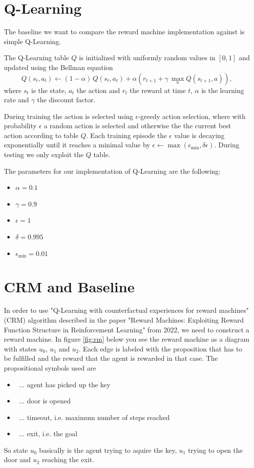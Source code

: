 \documentclass[12pt, a4paper]{article}
\begin{document}
\section*{Q-Learning}

The baseline we want to compare the reward machine implementation against is simple Q-Learning.

The Q-Learning table $Q$ is initialized with uniformly random values in $[0, 1]$ and updated using the Bellman equation
$$ Q(s_t, a_t) \leftarrow (1 - \alpha) \, Q(s_t, a_t) + \alpha \left( r_{t+1} + \gamma \, \max_a Q(s_{t+1}, a) \right), $$
where $s_t$ is the state, $a_t$ the action and $r_t$ the reward at time $t$, $\alpha$ is the learning rate and $\gamma$ the discount factor.

During training the action is selected using $\epsilon$-greedy action selection, where with probability $\epsilon$ a random action is selected and otherwise the the current best action according to table $Q$. Each training episode the $\epsilon$ value is decaying exponentially until it reaches a minimal value by $\epsilon \leftarrow \max(\epsilon_{\min}, \delta \epsilon)$. During testing we only exploit the $Q$ table.

The parameters for our implementation of Q-Learning are the following:
\begin{itemize}
	\item $\alpha = 0.1$
	\item $\gamma = 0.9$
	\item $\epsilon = 1$
	\item $\delta = 0.995$
	\item $\epsilon_{\min} = 0.01$
\end{itemize}

\section*{CRM and Baseline}

In order to use "Q-Learning with counterfactual experiences for reward machines" (CRM) algorithm described in the paper "Reward Machines: Exploiting Reward Function Structure in Reinforcement Learning" from 2022, we need to construct a reward machine. In figure \ref{fig:rm} below you see the reward machine as a diagram with states $u_0$, $u_1$ and $u_2$. Each edge is labeled with the proposition that has to be fulfilled and the reward that the agent is rewarded in that case. The propositional symbols used are
\begin{itemize}
	\item \faKey\ ... agent has picked up the key
	\item \faDoorOpen\ ... door is opened
	\item \faClock\ ... timeout, i.e. maximum number of steps reached
	\item \faSignOut*\ ... exit, i.e. the goal
\end{itemize}
So state $u_0$ basically is the agent trying to aquire the key, $u_1$ trying to open the door and $u_2$ reaching the exit.
\end{document}
